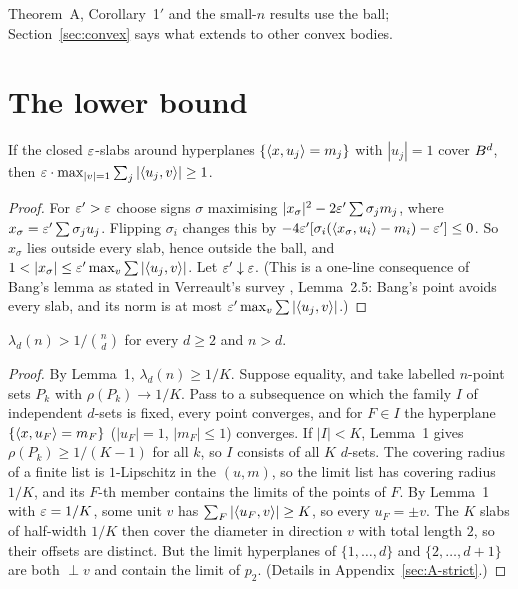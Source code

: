 \documentclass[11pt]{article}
\begin{document}
Theorem~A, Corollary~1$'$ and the small-$n$ results use the ball; Section~\ref{sec:convex} says what extends to
other convex bodies.

\section{The lower bound}\label{sec:lower}

\begin{lemOne}
If the closed $\varepsilon$-slabs around hyperplanes $\{\langle x,u_j\rangle=m_j\}$ with $|u_j|=1$ cover $B^d$, then
$\varepsilon\cdot\max_{|v|=1}\sum_j|\langle u_j,v\rangle|\ge1$.
\end{lemOne}

\begin{proof}
For $\varepsilon'>\varepsilon$ choose signs $\sigma$ maximising $|x_\sigma|^2-2\varepsilon'\sum\sigma_jm_j$, where
$x_\sigma=\varepsilon'\sum\sigma_ju_j$. Flipping $\sigma_i$ changes this by
$-4\varepsilon'[\sigma_i(\langle x_\sigma,u_i\rangle-m_i)-\varepsilon']\le0$. So $x_\sigma$ lies outside every slab, hence
outside the ball, and $1<|x_\sigma|\le\eps'\max_v\sum|\ip{u_j}{v}|$. Let $\varepsilon'\downarrow\varepsilon$. (This is
a one-line consequence of Bang's lemma as stated in Verreault's survey \cite{Verreault}, Lemma~2.5:
Bang's point avoids every slab, and its norm is at most $\varepsilon'\max_v\sum|\langle u_j,v\rangle|$.)
\end{proof}

\begin{corOne}
$\lambda_d(n)>1/\binom nd$ for every $d\ge2$ and $n>d$.
\end{corOne}

\begin{proof}
By Lemma~1, $\lambda_d(n)\ge1/K$. Suppose equality, and take labelled $n$-point sets $P_k$ with
$\rho(P_k)\to1/K$. Pass to a subsequence on which the family $I$ of independent $d$-sets is fixed, every
point converges, and for $F\in I$ the hyperplane $\{\langle x,u_F\rangle=m_F\}$ ($|u_F|=1$, $|m_F|\le1$)
converges. If $|I|<K$, Lemma~1 gives $\rho(P_k)\ge1/(K-1)$ for all $k$, so $I$ consists of all $K$
$d$-sets. The covering radius of a finite list is $1$-Lipschitz in the $(u,m)$, so the limit list has
covering radius $1/K$, and its $F$-th member contains the limits of the points of $F$. By Lemma~1 with
$\varepsilon=1/K$, some unit $v$ has $\sum_F|\langle u_F,v\rangle|\ge K$, so every $u_F=\pm v$. The $K$ slabs of
half-width $1/K$ then cover the diameter in direction $v$ with total length $2$, so their offsets are
distinct. But the limit hyperplanes of $\{1,\dots,d\}$ and $\{2,\dots,d+1\}$ are both $\perp v$ and
contain the limit of $p_2$. (Details in Appendix~\ref{sec:A-strict}.)
\end{proof}
\end{document}
